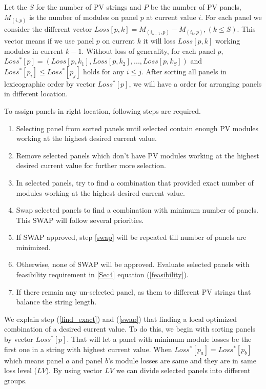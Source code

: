 \documentclass[conference]{IEEEtran}
\begin{document}

Let the $S$ for the number of PV strings and $P$ be the number of PV panels, $M_{(i,p)}$ is the number of modules on panel $p$ at current value $i$. For each panel we consider the different vector $Loss[p,k] = M_{(i_{k-1},p)}-M_{(i_{k},p)} ,(k \leq S)$. This vector means if we use panel $p$ on current $k$  it will loss $Loss[p,k]$ working modules in current $k-1$. Without loss of generality, for each panel $p$, $Loss^*[p] = ( Loss[p,k_1], Loss[p,k_2],..., Loss[p,k_S] )$ and $Loss^*[p_i] \leq Loss^*[p_j]$ holds for any $i \leq j$. After sorting all panels in lexicographic order by vector $Loss^*[p]$, we will have a order for arranging panels in different location.

To assign panels in right location, following steps are required.
\begin{enumerate}[(1)]
\item Selecting panel from sorted panels until selected contain enough PV modules working at the highest desired current value.
\item Remove selected panels which don't have PV modules working at the highest desired current value for further more selection.
\item In selected panels, try to find a combination that provided exact number of modules working at the highest desired current value.\label{find_exact}
\item Swap selected panels to find a combination with minimum number of panels. This SWAP will follow several priorities.\label{swap}
\item If SWAP approved, step \ref{swap} will be repeated till number of panels are minimized.
\item Otherwise, none of SWAP will be approved. Evaluate selected panels with feasibility requirement in \ref{Sec4} equation (\ref{feasibility}).
\item If there remain any un-selected panel, as them to different PV strings that balance the string length.
\end{enumerate}

We explain step (\ref{find_exact}) and (\ref{swap}) that finding a local optimized combination of a desired current value. To do this, we begin with sorting panels by vector $Loss^*[p]$. That will let a panel with minimum module losses be the first one in a string with highest current value. When $Loss^*[p_a] = Loss^*[p_b]$ which means panel $a$ and panel $b$'s module losses are same and they are in same loss level ($LV$). By using vector $LV$ we can divide selected panels into different groups.
\end{document}
